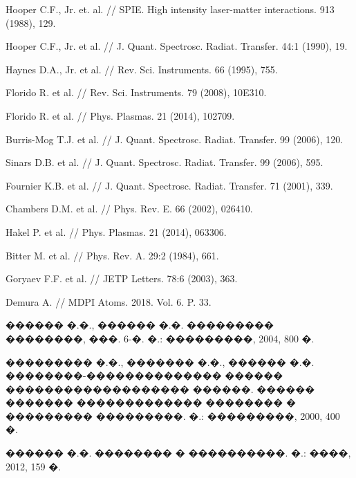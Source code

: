 \documentclass[12pt,titlepage]{article}
\begin{document}
\begin{thebibliography}{99}
 Hooper C.F., Jr. et. al. // SPIE. High intensity laser-matter interactions. 913 (1988), 129.

 Hooper C.F., Jr. et al. // J. Quant. Spectrosc. Radiat. Transfer. 44:1 (1990), 19.

 Haynes D.A., Jr. et al. // Rev. Sci. Instruments. 66 (1995), 755.

 Florido R. et al. // Rev. Sci. Instruments. 79 (2008), 10E310.

 Florido R. et al. // Phys. Plasmas. 21 (2014), 102709.

 Burris-Mog T.J. et al. // J. Quant. Spectrosc. Radiat. Transfer. 99 (2006), 120.

 Sinars D.B. et al. // J. Quant. Spectrosc. Radiat. Transfer. 99 (2006), 595.

 Fournier K.B. et al. // J. Quant. Spectrosc. Radiat. Transfer. 71 (2001), 339.

 Chambers D.M. et al. // Phys. Rev. E. 66 (2002), 026410.

 Hakel P. et al. // Phys. Plasmas. 21 (2014), 063306.

 Bitter M. et al. // Phys. Rev. A. 29:2 (1984), 661.

 Goryaev F.F. et al. // JETP Letters. 78:6 (2003), 363.

 Demura A. // MDPI Atoms. 2018. Vol. 6. P. 33.

 ������ �.�., ������ �.�. ��������� ��������, ���. 6-�. �.: ���������, 2004, 800 �.

 ��������� �.�., ������� �.�., ������ �.�. ��������-�������������� ������ ������������������� ������. ������ ������� ������������� �������� � ��������� ���������. �.: ���������, 2000, 400 �.

 ������ �.�. �������� � ����������. �.: ����, 2012,  159 �.
\end{thebibliography}

\end{document}

